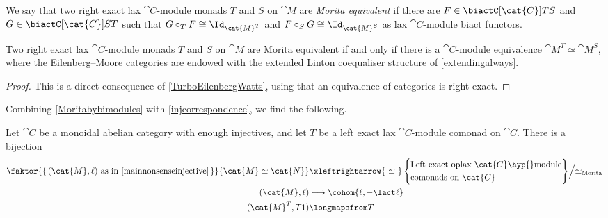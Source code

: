\begin{definition}
  We say that two right exact lax \(\cat{C}\)\hyp{}module monads \(T\) and \(S\) on \(\cat{M}\)
  are \emph{Morita equivalent} if there are
  \(F \in \biactC[\cat{C}]{T}{S}\) and
  \(G \in \biactC[\cat{C}]{S}{T}\)
  such that \(G \circ_{T} F \cong \Id_{\cat{M}^T}\)
  and \(F \circ_{S} G \cong \Id_{\cat{M}^{S}}\)
  as lax \(\cat{C}\)\hyp{}module biact functors.
\end{definition}

\begin{proposition}\label{Moritabybimodules}
  Two right exact lax \(\cat{C}\)\hyp{}module monads \(T\) and \(S\) on \(\cat{M}\)
  are Morita equivalent if and only if
  there is a \(\cat{C}\)\hyp{}module equivalence \(\cat{M}^T \simeq \cat{M}^{S}\),
  where the Eilenberg--Moore categories are endowed with the extended Linton coequaliser structure of \cref{extendingalways}.
\end{proposition}
\begin{proof}
  This is a direct consequence of \cref{TurboEilenbergWatts},
  using that an equivalence of categories is right exact.
\end{proof}

Combining \cref{Moritabybimodules} with \cref{injcorrespondence}, we find the following.

\begin{theorem}\label{injectivebijection}
  Let \(\cat{C}\) be a monoidal abelian category with enough injectives,
  and let \(T\) be a left exact lax \(\cat{C}\)\hyp{}module comonad on \(\cat{C}\).
  There is a bijection
  \begin{align*}
    \faktor{\{\,(\cat{M},\ell) \text{ as in \cref{mainnonsenseinjective}}\,\}}{\cat{M} \simeq \cat{N}}
    &\xleftrightarrow{\ \simeq\ }
      \left\{\begin{aligned}
        &\text{Left exact oplax \(\cat{C}\)\hyp{}module}\\
        &\text{comonads on \(\cat{C}\)}
      \end{aligned}
      \right\}\!\Big/\!\!\simeq_{\text{Morita}} \\
    (\cat{M},\ell) &\longmapsto \cohom{\ell,-\lact \ell} \\
    (\cat{M}^T, T1) &\longmapsfrom T
  \end{align*}
\end{theorem}

